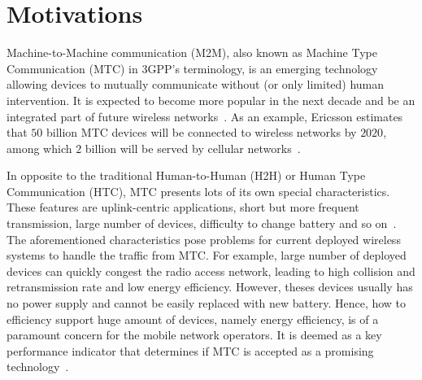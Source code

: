 \section{Motivations}
\label{sec:chapter1-motivations}
Machine-to-Machine communication (M2M), also known as Machine Type Communication (MTC) in 3GPP's terminology, is an emerging technology allowing devices to mutually communicate without (or only limited) human intervention. It is expected to become more popular in the next decade and be an integrated part of future wireless networks~\cite{3GPP/service-requirement}\cite{3GPP/ranimprovements}. As an example, Ericsson estimates that $50$ billion MTC devices will be connected to wireless networks by $2020$, among which $2$ billion will be served by cellular networks~\cite{Eri11}.

In opposite to the traditional Human-to-Human (H2H) or Human Type Communication (HTC), MTC presents lots of its own special characteristics. These features are uplink-centric applications, short but more frequent transmission, large number of devices, difficulty to change battery and so on~\cite{FirstLook12}. The aforementioned characteristics pose problems for current deployed wireless systems to handle the traffic from MTC. For example, large number of deployed devices can quickly congest the radio access network, leading to high collision and retransmission rate and low energy efficiency. However, theses devices usually has no power supply and cannot be easily replaced with new battery. Hence, 
how to efficiency support huge amount of devices, namely energy efficiency,  is of a paramount concern for the mobile network operators. It is 
deemed as a key performance indicator that determines if MTC is accepted as a promising technology~\cite{lu11GRS}\cite{Costa14}. 

